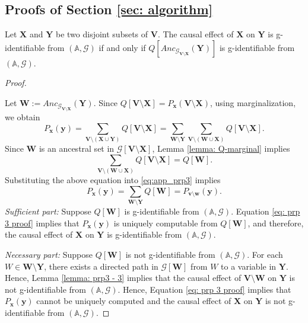 \documentclass[accepted]{uai2022}
\newenvironment{customprp}[1]{\renewcommand\theproposition{#1}\proposition}{\endproposition}
\newenvironment{myproof}[1][\proofname]{%
  \begin{proof}[#1]$ $\nobreak\ignorespaces
}{%
  \end{proof}
}
\newcommand{\Anc}[2]{\textit{Anc}_{#2}(#1)}
\newcommand{\V}[0]{\mathbf{V}}
\newcommand{\W}[0]{\mathbf{W}}
\newcommand{\X}[0]{\mathbf{X}}
\newcommand{\Y}[0]{\mathbf{Y}}
\newcommand{\x}[0]{\mathbf{x}}
\newcommand{\y}[0]{\mathbf{y}}
\newcommand{\G}[0]{\mathcal{G}}
\begin{document}
    \subsection{Proofs of Section \ref{sec: algorithm}} \label{sec: proof sec algorithm}
        \begin{customprp}{\ref{prp: 3}}
            Let $\X$ and $\Y$ be two disjoint subsets of $\V$.
            The causal effect of $\X$ on $\Y$ is g-identifiable from $(\mathbb{A},\G)$ if and only if $Q[\Anc{\Y}{\G_{\V \setminus \X}}]$ is g-identifiable from $(\mathbb{A},\G)$.
        \end{customprp}
        \begin{myproof}[Proof]
            Let $\mathbf{W}:=\Anc{\Y}{\G_{\V \setminus \X}}$.
            Since $Q[\V \setminus \X] = P_{\x}(\V \setminus \X)$, using marginalization, we obtain
            \begin{equation}\label{eq:app_prp3}
                P_{\mathbf{x}}(\mathbf{y}) = \sum_{\V \setminus (\X \cup \Y)}Q[\V \setminus \X] = \sum_{\W \setminus \Y} \sum_{\V \setminus (\W \cup \X)} Q[\V \setminus \X].
            \end{equation}
            Since $\W$ is an ancestral set in $\G[\V \setminus \X]$, Lemma \ref{lemma: Q-marginal} implies
            \begin{equation*}
                \sum_{\V \setminus (\W \cup \X)} Q[\V \setminus \X] = Q[\W].
            \end{equation*}
            Substituting the above equation into \eqref{eq:app_prp3} implies
            \begin{equation} \label{eq: prp 3 proof}
                P_{\mathbf{x}}(\mathbf{y}) = \sum_{\W \setminus \Y} Q[\W] = P_{\mathbf{v}\setminus \mathbf{w}}(\y).
            \end{equation}
            \textit{Sufficient part:} 
            Suppose $Q[\W]$ is g-identifiable from $(\mathbb{A},\G)$.
            Equation \eqref{eq: prp 3 proof} implies that $P_{\mathbf{x}}(\mathbf{y})$ is uniquely computable from $Q[\W]$, and therefore, the causal effect of $\X$ on $\Y$ is g-identifiable from $(\mathbb{A},\G)$.
            
            \textit{Necessary part:}
            Suppose $Q[\W]$ is not g-identifiable from $(\mathbb{A}, \G)$. 
            For each $W \in \W \setminus \Y$, there exists a directed path in $\G[\W]$ from $W$ to a variable in $\Y$. 
            Hence, Lemma \ref{lemma: prp3 - 3} implies that the causal effect of $\V \setminus \W$ on $\Y$ is not g-identifiable from $(\mathbb{A}, \G)$. 
            Hence, Equation \eqref{eq: prp 3 proof} implies that $ P_{\mathbf{x}}(\mathbf{y})$ cannot be uniquely computed and the causal effect of $\X$ on $\Y$ is not g-identifiable from $(\mathbb{A},\G)$.
        \end{myproof}
        
\end{document}
